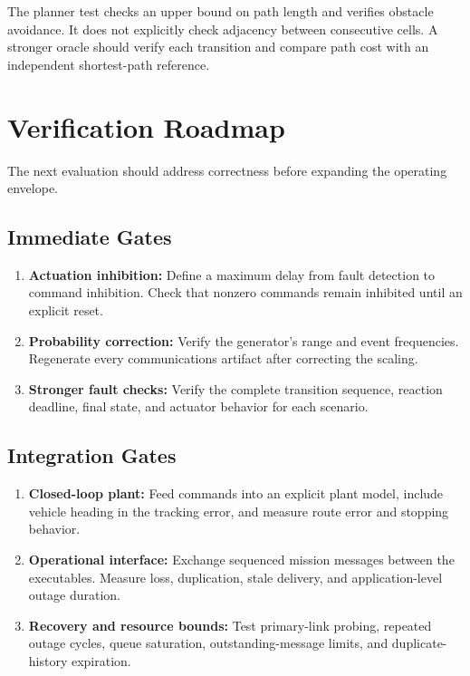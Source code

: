 \documentclass[conference]{IEEEtran}
\begin{document}
The planner test checks an upper bound on path length
and verifies obstacle avoidance. It does not explicitly
check adjacency between consecutive cells. A stronger
oracle should verify each transition and compare path
cost with an independent shortest-path reference.

\section{Verification Roadmap}

The next evaluation should address correctness before
expanding the operating envelope.

\subsection{Immediate Gates}

\begin{enumerate}
  \item \textbf{Actuation inhibition:}
  Define a maximum delay from fault detection to command
  inhibition. Check that nonzero commands remain
  inhibited until an explicit reset.

  \item \textbf{Probability correction:}
  Verify the generator's range and event frequencies.
  Regenerate every communications artifact after
  correcting the scaling.

  \item \textbf{Stronger fault checks:}
  Verify the complete transition sequence, reaction
  deadline, final state, and actuator behavior for
  each scenario.
\end{enumerate}

\subsection{Integration Gates}

\begin{enumerate}
  \item \textbf{Closed-loop plant:}
  Feed commands into an explicit plant model, include
  vehicle heading in the tracking error, and measure
  route error and stopping behavior.

  \item \textbf{Operational interface:}
  Exchange sequenced mission messages between the
  executables. Measure loss, duplication, stale
  delivery, and application-level outage duration.

  \item \textbf{Recovery and resource bounds:}
  Test primary-link probing, repeated outage cycles,
  queue saturation, outstanding-message limits, and
  duplicate-history expiration.
\end{enumerate}
\end{document}
